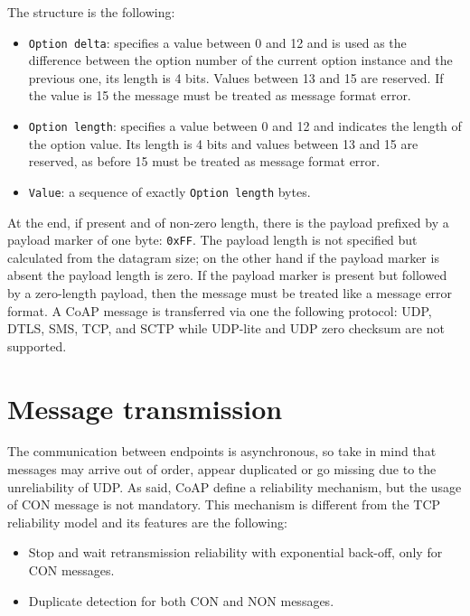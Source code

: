 	The structure is the following:\newline
	\begin{itemize}
		\item \texttt{Option delta}: specifies a value between 0 and 12 and is used as the difference between the option number of the current option instance and the previous one, its length is 4 bits.
		Values between 13 and 15 are reserved.
		If the value is 15 the message must be treated as message format error.
		\item \texttt{Option length}: specifies a value between 0 and 12 and indicates the length of the option value.
		Its length is 4 bits and values between 13 and 15 are reserved, as before 15 must be treated as message format error.
		\item \texttt{Value}: a sequence of exactly \texttt{Option length} bytes.
	\end{itemize}

	At the end, if present and of non-zero length, there is the payload prefixed by a payload marker of one byte: \texttt{0xFF}.\newline
	The payload length is not specified but calculated from the datagram size; on the other hand if the payload marker is absent the payload length is zero.\newline
	If the payload marker is present but followed by a zero-length payload, then the message must be treated like a message error format.\newline
	A CoAP message is transferred via one the following protocol: UDP, DTLS, SMS, TCP, and SCTP while UDP-lite and UDP zero checksum are not supported.\newline

	
	\section{Message transmission}\label{sc:message_transmission}
	The communication between endpoints is asynchronous, so take in mind that messages may arrive out of order, appear duplicated or go missing due to the unreliability of UDP.\newline
	As said, CoAP define a reliability mechanism, but the usage of CON message is not mandatory. This mechanism is different from the TCP reliability model and its features are the following:\newline
	\begin{itemize}
		\item Stop and wait retransmission reliability with exponential back-off, only for CON messages.
		\item Duplicate detection for both CON and NON messages.
	\end{itemize}

